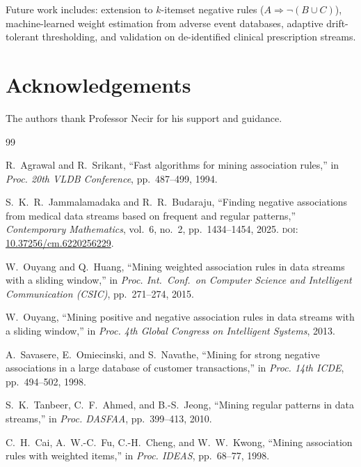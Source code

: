 \documentclass[10pt,twocolumn]{article}
\theoremstyle{plain}
\theoremstyle{definition}
\theoremstyle{remark}
\begin{document}
Future work includes: extension to $k$-itemset negative rules
($A \Rightarrow \lnot (B \cup C)$), machine-learned weight estimation
from adverse event databases, adaptive drift-tolerant thresholding,
and validation on de-identified clinical prescription streams.

\section*{Acknowledgements}
The authors thank Professor Necir for his support and guidance.


\begin{thebibliography}{99}

R.~Agrawal and R.~Srikant,
``Fast algorithms for mining association rules,''
in \textit{Proc. 20th VLDB Conference}, pp.~487--499, 1994.

S.~K.~R.~Jammalamadaka and R.~R.~Budaraju,
``Finding negative associations from medical data streams based on
frequent and regular patterns,''
\textit{Contemporary Mathematics}, vol.~6, no.~2, pp.~1434--1454, 2025.
\textsc{doi}: \href{https://doi.org/10.37256/cm.6220256229}%
{10.37256/cm.6220256229}.

W.~Ouyang and Q.~Huang,
``Mining weighted association rules in data streams with a sliding
window,''
in \textit{Proc. Int.\ Conf.\ on Computer Science and Intelligent
Communication (CSIC)}, pp.~271--274, 2015.

W.~Ouyang,
``Mining positive and negative association rules in data streams with
a sliding window,''
in \textit{Proc. 4th Global Congress on Intelligent Systems}, 2013.

A.~Savasere, E.~Omiecinski, and S.~Navathe,
``Mining for strong negative associations in a large database of
customer transactions,''
in \textit{Proc. 14th ICDE}, pp.~494--502, 1998.

S.~K.~Tanbeer, C.~F.~Ahmed, and B.-S.~Jeong,
``Mining regular patterns in data streams,''
in \textit{Proc. DASFAA}, pp.~399--413, 2010.

C.~H.~Cai, A.~W.-C.~Fu, C.-H.~Cheng, and W.~W.~Kwong,
``Mining association rules with weighted items,''
in \textit{Proc. IDEAS}, pp.~68--77, 1998.

\end{thebibliography}
\end{document}
